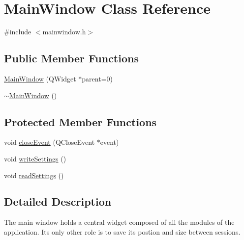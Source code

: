 \hypertarget{class_main_window}{
\section{\-Main\-Window \-Class \-Reference}
\label{class_main_window}
}


{\ttfamily \#include $<$mainwindow.\-h$>$}

\subsection*{\-Public \-Member \-Functions}
\begin{DoxyCompactItemize}
\item 
\hyperlink{class_main_window_a8b244be8b7b7db1b08de2a2acb9409db}{\-Main\-Window} (\-Q\-Widget $\ast$parent=0)
\item 
\hyperlink{class_main_window_ae98d00a93bc118200eeef9f9bba1dba7}{$\sim$\-Main\-Window} ()
\end{DoxyCompactItemize}
\subsection*{\-Protected \-Member \-Functions}
\begin{DoxyCompactItemize}
\item 
void \hyperlink{class_main_window_a4e20a4a065fbb0e4d3532a45a0a91425}{close\-Event} (\-Q\-Close\-Event $\ast$event)
\item 
void \hyperlink{class_main_window_a49be45fc9b993fdc3afe55d4b6fa0650}{write\-Settings} ()
\item 
void \hyperlink{class_main_window_a06476208b8466211f3bb0fcae787052b}{read\-Settings} ()
\end{DoxyCompactItemize}


\subsection{\-Detailed \-Description}
\-The main window holds a central widget composed of all the modules of the application. \-Its only other role is to save its postion and size between sessions. 

